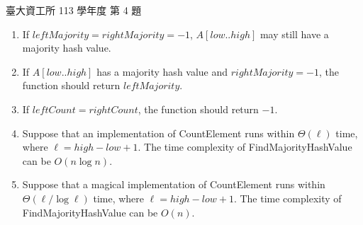\begin{pastexam}[label={px:ntu-113-dsa-04}]{臺大資工所 113 學年度 第 4 題}
\begin{enumerate}[label=\Alph*.]
\item If $\mathit{leftMajority}=\mathit{rightMajority}=-1$, $A[\mathit{low}..\mathit{high}]$ may still
have a majority hash value.
\item If $A[\mathit{low}..\mathit{high}]$ has a majority hash value and $\mathit{rightMajority}=-1$,
the function should return $\mathit{leftMajority}$.
\item If $\mathit{leftCount}=\mathit{rightCount}$, the function should return $-1$.
\item Suppose that an implementation of CountElement runs within $\Theta(\ell)$ time, where
$\ell=\mathit{high}-\mathit{low}+1$. The time complexity of FindMajorityHashValue can be
$O(n\log n)$.
\item Suppose that a magical implementation of CountElement runs within $\Theta(\ell/\log\ell)$
time, where $\ell=\mathit{high}-\mathit{low}+1$. The time complexity of FindMajorityHashValue can be
$O(n)$.
\end{enumerate}
\end{pastexam}

